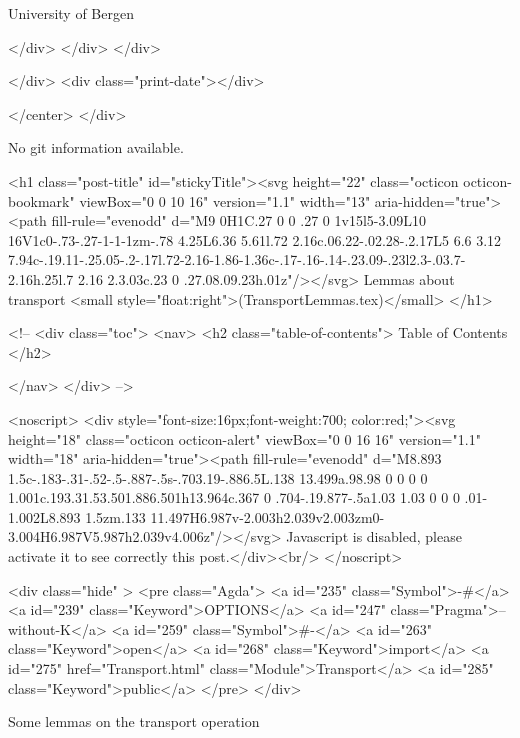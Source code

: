                   University of Bergen
                
                </div>
            </div>
          </div>
          
          
        </div>
        <div class="print-date"></div>
        
        
    </center>
  </div>

  
  No git information available.
  

  <h1 class="post-title" id="stickyTitle"><svg height="22" class="octicon octicon-bookmark" viewBox="0 0 10 16" version="1.1" width="13" aria-hidden="true"><path fill-rule="evenodd" d="M9 0H1C.27 0 0 .27 0 1v15l5-3.09L10 16V1c0-.73-.27-1-1-1zm-.78 4.25L6.36 5.61l.72 2.16c.06.22-.02.28-.2.17L5 6.6 3.12 7.94c-.19.11-.25.05-.2-.17l.72-2.16-1.86-1.36c-.17-.16-.14-.23.09-.23l2.3-.03.7-2.16h.25l.7 2.16 2.3.03c.23 0 .27.08.09.23h.01z"/></svg> Lemmas about transport  <small style="float:right">(TransportLemmas.tex)</small>
  </h1>

  <!-- 
  <div class="toc">
    <nav>
    <h2 class="table-of-contents"> Table of Contents </h2>
      

    </nav>
  </div>
   -->

  <noscript>
  <div style="font-size:16px;font-weight:700; color:red;"><svg height="18" class="octicon octicon-alert" viewBox="0 0 16 16" version="1.1" width="18" aria-hidden="true"><path fill-rule="evenodd" d="M8.893 1.5c-.183-.31-.52-.5-.887-.5s-.703.19-.886.5L.138 13.499a.98.98 0 0 0 0 1.001c.193.31.53.501.886.501h13.964c.367 0 .704-.19.877-.5a1.03 1.03 0 0 0 .01-1.002L8.893 1.5zm.133 11.497H6.987v-2.003h2.039v2.003zm0-3.004H6.987V5.987h2.039v4.006z"/></svg> Javascript is disabled, please activate it to see correctly this post.</div><br/>
  </noscript>

  <div class="hide" >
<pre class="Agda">
<a id="235" class="Symbol">{-#</a> <a id="239" class="Keyword">OPTIONS</a> <a id="247" class="Pragma">--without-K</a> <a id="259" class="Symbol">#-}</a>
<a id="263" class="Keyword">open</a> <a id="268" class="Keyword">import</a> <a id="275" href="Transport.html" class="Module">Transport</a> <a id="285" class="Keyword">public</a>
</pre>
</div>

Some lemmas on the transport operation

